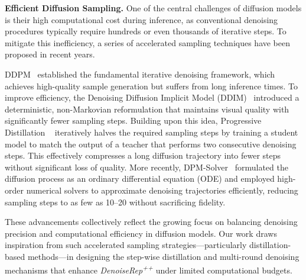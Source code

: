 \documentclass[conference]{IEEEtran}
\begin{document}
\textbf{Efficient Diffusion Sampling.} One of the central challenges of diffusion models is their high computational cost during inference, as conventional denoising procedures typically require hundreds or even thousands of iterative steps. To mitigate this inefficiency, a series of accelerated sampling techniques have been proposed in recent years.

DDPM~\cite{ho2020denoising} established the fundamental iterative denoising framework, which achieves high-quality sample generation but suffers from long inference times.
To improve efficiency, the Denoising Diffusion Implicit Model (DDIM)~\cite{song2020denoising} introduced a deterministic, non-Markovian reformulation that maintains visual quality with significantly fewer sampling steps.
Building upon this idea, Progressive Distillation ~\cite{salimans2022progressive} iteratively halves the required sampling steps by training a student model to match the output of a teacher that performs two consecutive denoising steps. This effectively compresses a long diffusion trajectory into fewer steps without significant loss of quality.
More recently, DPM-Solver~\cite{lu2022dpm} formulated the diffusion process as an ordinary differential equation (ODE) and employed high-order numerical solvers to approximate denoising trajectories efficiently, reducing sampling steps to as few as 10–20 without sacrificing fidelity.

These advancements collectively reflect the growing focus on balancing denoising precision and computational efficiency in diffusion models.
Our work draws inspiration from such accelerated sampling strategies—particularly distillation-based methods—in designing the step-wise distillation and multi-round denoising mechanisms that enhance \textit{DenoiseRep\textsuperscript{++}} under limited computational budgets.
\end{document}
